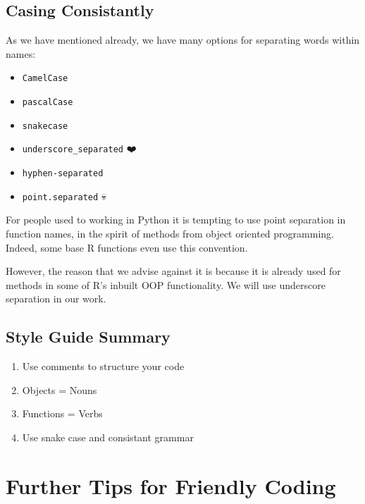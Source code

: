 \documentclass[
  12pt,
]{book}
\providecommand{\tightlist}{%
  \setlength{\itemsep}{0pt}\setlength{\parskip}{0pt}}
\begin{document}
\hypertarget{casing-consistantly}{%
\subsection{Casing Consistantly}\label{casing-consistantly}}

As we have mentioned already, we have many options for separating words within names:

\begin{itemize}
\tightlist
\item
  \texttt{CamelCase}
\item
  \texttt{pascalCase}
\item
  \texttt{snakecase}
\item
  \texttt{underscore\_separated} ❤️
\item
  \texttt{hyphen-separated}
\item
  \texttt{point.separated} 💀
\end{itemize}

For people used to working in Python it is tempting to use point separation in function names, in the spirit of methods from object oriented programming. Indeed, some base R functions even use this convention.

However, the reason that we advise against it is because it is already used for methods in some of R's inbuilt OOP functionality. We will use underscore separation in our work.

\hypertarget{style-guide-summary}{%
\subsection{Style Guide Summary}\label{style-guide-summary}}

\begin{enumerate}
\def\labelenumi{\arabic{enumi}.}
\tightlist
\item
  Use comments to structure your code
\item
  Objects = Nouns
\item
  Functions = Verbs
\item
  Use snake case and consistant grammar
\end{enumerate}

\hypertarget{further-tips-for-friendly-coding}{%
\section{Further Tips for Friendly Coding}\label{further-tips-for-friendly-coding}}
\end{document}

